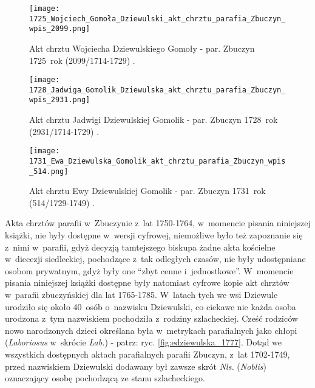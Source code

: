 \begin{figure}[!ht]
    \vspace*{0.5cm}
    \centering \texttt{[image: 
        1725\_Wojciech\_Gomoła\_Dziewulski\_akt\_chrztu\_parafia\_Zbuczyn\_wpis\_2099.png]}
    \captionsetup{format=hang}
    \caption{Akt chrztu Wojciecha Dziewulskiego Gomoły - par. Zbuczyn 
    1725~rok (2099/1714-1729) \cite{par_zbuczyn2}.}
    \label{fig:wgomola_1725}
\end{figure}

\begin{figure}[!ht]
    \vspace*{0.5cm}
    \centering \texttt{[image: 
        1728\_Jadwiga\_Gomolik\_Dziewulska\_akt\_chrztu\_parafia\_Zbuczyn\_wpis\_2931.png]}
    \captionsetup{format=hang}
    \caption{Akt chrztu Jadwigi Dziewulskiej Gomolik - par. Zbuczyn 1728~rok 
    (2931/1714-1729) \cite{par_zbuczyn2}.}
    \label{fig:jgomola_1728}
\end{figure}

\begin{figure}[!ht]
    \vspace*{0.5cm}
    \centering \texttt{[image: 
        1731\_Ewa\_Dziewulska\_Gomolik\_akt\_chrztu\_parafia\_Zbuczyn\_wpis\_514.png]}
    \captionsetup{format=hang}
    \caption{Akt chrztu Ewy Dziewulskiej Gomolik - par. Zbuczyn 1731~rok 
    (514/1729-1749) \cite{par_zbuczyn3}.}
    \label{fig:egomola_1731}
\end{figure}

Akta chrztów parafii w~Zbuczynie z~lat 1750-1764, w~momencie pisania 
niniejszej książki, nie były dostępne w~wersji cyfrowej, niemożliwe było też 
zapoznanie się z~nimi w~parafii, gdyż decyzją tamtejszego biskupa żadne akta 
kościelne w~diecezji siedleckiej, pochodzące z~tak odległych czasów, nie były 
udostępniane osobom prywatnym, gdyż były one \enquote{zbyt cenne 
i~jednostkowe}. W~momencie pisania niniejszej książki dostępne były natomiast 
cyfrowe kopie akt chrztów w~parafii zbuczyńskiej dla lat 1765-1785. W~latach 
tych we wsi Dziewule urodziło się około 40~osób o~nazwisku Dziewulski, co 
ciekawe nie każda osoba urodzona z~tym nazwiskiem pochodziła z~rodziny 
szlacheckiej. Cześć rodziców nowo narodzonych dzieci określana była 
w~metrykach parafialnych jako chłopi (\emph{Laboriosus} w~skrócie 
\emph{Lab.}) - patrz: ryc. \ref{fig:edziewulska_1777}. Dotąd we wszystkich 
dostępnych aktach parafialnych parafii Zbuczyn, z~lat 1702-1749, przed 
nazwiskiem Dziewulski dodawany był zawsze skrót \emph{Nls.} (\emph{Noblis}) 
oznaczający osobę pochodzącą ze stanu szlacheckiego.

